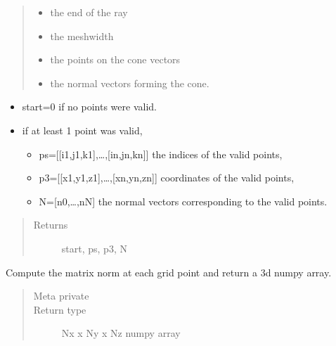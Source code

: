 \documentclass[letterpaper,10pt,english]{sphinxmanual}
\begin{document}
\begin{fulllineitems}
\begin{fulllineitems}
\begin{quote}
\begin{description}
\begin{itemize}
\item {} 
 \textendash{} the end of the ray

\item {} 
 \textendash{} the meshwidth

\item {} 
 \textendash{} the points on the cone vectors

\item {} 
 \textendash{} the normal vectors forming the cone.

\end{itemize}

\end{description}\end{quote}
\begin{itemize}
\item {} 
start=0 if no points were valid.

\item {} 
if at least 1 point was valid,
\begin{itemize}
\item {} 
ps={[}{[}i1,j1,k1{]},…,{[}in,jn,kn{]}{]} the indices of the valid points,

\item {} 
p3={[}{[}x1,y1,z1{]},…,{[}xn,yn,zn{]}{]} co\sphinxhyphen{}ordinates of the valid points,

\item {} 
N={[}n0,…,nN{]} the normal vectors corresponding to the valid points.

\end{itemize}

\end{itemize}
\begin{quote}\begin{description}
\item[{Returns}] \leavevmode
start, ps, p3, N

\end{description}\end{quote}

\end{fulllineitems}


\begin{fulllineitems}
\label{\detokenize{index:DictionarySparseMatrix.DS.togrid}}
Compute the matrix norm at each grid point and return a     3d numpy array.
\begin{quote}\begin{description}
\item[{Meta private}] \leavevmode
\item[{Return type}] \leavevmode
Nx x Ny x Nz numpy array


\end{description}
\end{quote}
\end{fulllineitems}
\end{fulllineitems}
\end{document}
